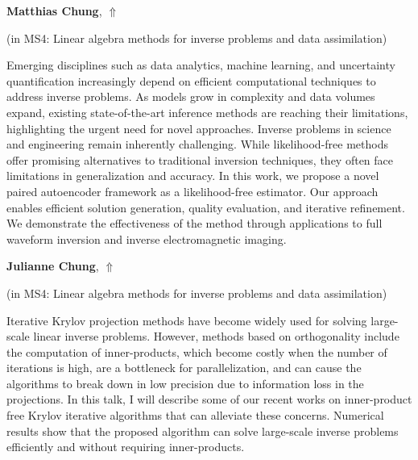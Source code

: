 \documentclass[ILAS2025-program.tex]{subfiles}
\begin{document}
\hypertarget{down0202}{}\begin{ilasabstract}
    
\textbf{Matthias Chung},  \hfill \hyperlink{up0202}{$\Uparrow$}
    
    
(in {\color{mstitle}MS4: Linear algebra methods for inverse problems and data assimilation})
        
\mtskip
    Emerging disciplines such as data analytics, machine learning, and uncertainty quantification increasingly depend on efficient computational techniques to address inverse problems. As models grow in complexity and data volumes expand, existing state-of-the-art inference methods are reaching their limitations, highlighting the urgent need for novel approaches.
Inverse problems in science and engineering remain inherently challenging. While likelihood-free methods offer promising alternatives to traditional inversion techniques, they often face limitations in generalization and accuracy. In this work, we propose a novel paired autoencoder framework as a likelihood-free estimator. Our approach enables efficient solution generation, quality evaluation, and iterative refinement. We demonstrate the effectiveness of the method through applications to full waveform inversion and inverse electromagnetic imaging.

\end{ilasabstract}
    

\hypertarget{down0312}{}\begin{ilasabstract}
    
\textbf{Julianne Chung},  \hfill \hyperlink{up0312}{$\Uparrow$}
    
    
(in {\color{mstitle}MS4: Linear algebra methods for inverse problems and data assimilation})
        
\mtskip
    Iterative Krylov projection methods have become widely used for solving large-scale linear inverse problems. However, methods based on orthogonality include the computation of inner-products, which become costly when the number of iterations is high, are a bottleneck for parallelization, and can cause the algorithms to break down in low precision due to information loss in the projections. In this talk, I will describe some of our recent works on inner-product free Krylov iterative algorithms that can alleviate these concerns. Numerical results show that the proposed algorithm can solve large-scale inverse problems efficiently and without requiring inner-products.

\end{ilasabstract}
    
\end{document}
